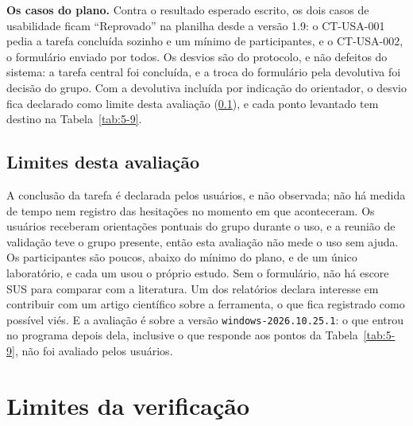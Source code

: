 
\textbf{Os casos do plano.} Contra o resultado esperado escrito, os dois casos de usabilidade ficam ``Reprovado'' na planilha desde a versão 1.9: o CT-USA-001 pedia a tarefa concluída sozinho e um mínimo de participantes, e o CT-USA-002, o formulário enviado por todos. Os desvios são do protocolo, e não defeitos do sistema: a tarefa central foi concluída, e a troca do formulário pela devolutiva foi decisão do grupo. Com a devolutiva incluída por indicação do orientador, o desvio fica declarado como limite desta avaliação (\ref{sec:5-4-5}), e cada ponto levantado tem destino na Tabela~\ref{tab:5-9}.

\subsection{Limites desta avaliação}\label{sec:5-4-5}

A conclusão da tarefa é declarada pelos usuários, e não observada; não há medida de tempo nem registro das hesitações no momento em que aconteceram. Os usuários receberam orientações pontuais do grupo durante o uso, e a reunião de validação teve o grupo presente, então esta avaliação não mede o uso sem ajuda. Os participantes são poucos, abaixo do mínimo do plano, e de um único laboratório, e cada um usou o próprio estudo. Sem o formulário, não há escore SUS para comparar com a literatura. Um dos relatórios declara interesse em contribuir com um artigo científico sobre a ferramenta, o que fica registrado como possível viés. E a avaliação é sobre a versão \texttt{windows-\allowbreak{}2026.\allowbreak{}10.\allowbreak{}25.\allowbreak{}1}: o que entrou no programa depois dela, inclusive o que responde aos pontos da Tabela~\ref{tab:5-9}, não foi avaliado pelos usuários.

\section{Limites da verificação}\label{sec:5-5}

